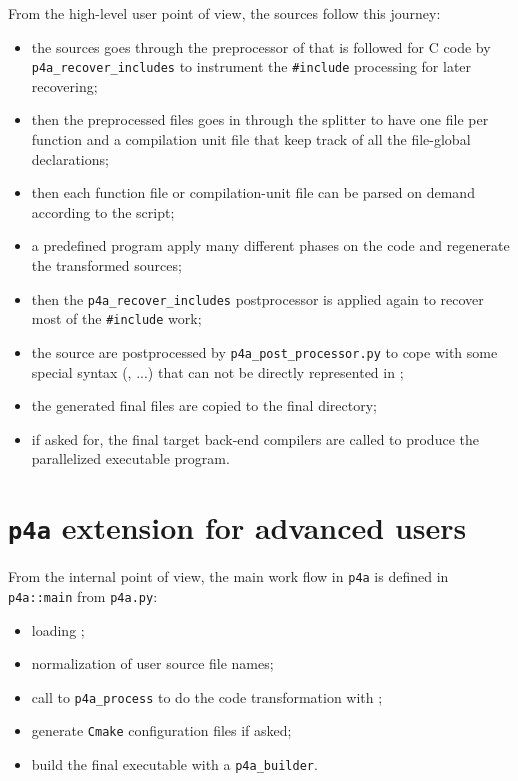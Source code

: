 \documentclass[a4paper]{article}
\begin{document}
From the high-level user point of view, the sources follow this journey:
\begin{itemize}
\item the sources goes through the preprocessor of \Apips that is followed
  for C code by \verb|p4a_recover_includes| to instrument the
  \verb|#include| processing for later recovering;
\item then the preprocessed files goes in \Apips through the splitter to
  have one file per function and a compilation unit file that keep track
  of all the file-global declarations;
\item then each function file or compilation-unit file can be parsed on
  demand according to the \Apyps script;
\item a predefined \Apyps program apply many different \Apips phases on
  the code and regenerate the transformed sources;
\item then the \verb|p4a_recover_includes| postprocessor is applied again
  to recover most of the \verb|#include| work;
\item the source are postprocessed by \verb|p4a_post_processor.py| to cope
  with some special syntax (\Acuda, \Aopencl...) that can not be directly
  represented in \Apips;
\item the generated final files are copied to the final directory;
\item if asked for, the final target back-end compilers are called to
  produce the parallelized executable program.
\end{itemize}


\section{\protect\texttt{p4a} extension for advanced users}
\label{sec:p4a-extension}

From the internal point of view, the main work flow in \texttt{p4a} is
defined in \verb|p4a::main| from \verb|p4a.py|:
\begin{itemize}
\item loading \Apyps;
\item normalization of user source file names;
\item call to \verb|p4a_process| to do the code transformation with \Apyps;
\item generate \texttt{Cmake} configuration files if asked;
\item build the final executable with a \verb|p4a_builder|.
\end{itemize}
\end{document}
